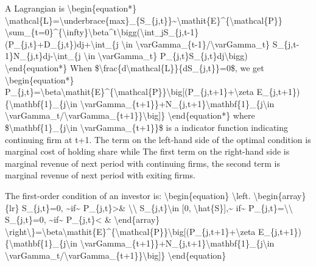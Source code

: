 \documentclass[10pt,math=newtx,citestyle=gb7714-2015,bibstyle=gb7714-2015]{elegantbook}
\begin{document}
	A Lagrangian is
	\textbackslash{}begin\{equation*\}
	\textbackslash{}mathcal\{L\}=\textbackslash{}underbrace\{max\}\_\{S\_\{j,t\}\}\~{}\textbackslash{}mathit\{E\}\^{}\{\textbackslash{}mathcal\{P\}\} \textbackslash{}sum\_\{t=0\}\^{}\{\textbackslash{}infty\}\textbackslash{}beta\^{}t\textbackslash{}bigg(\textbackslash{}int\_jS\_\{j,t-1\}(P\_\{j,t\}+D\_\{j,t\})dj+\textbackslash{}int\_\{j \textbackslash{}in \textbackslash{}varGamma\_\{t-1\}/\textbackslash{}varGamma\_t\} S\_\{j,t-1\}N\_\{j,t\}dj-\textbackslash{}int\_\{j \textbackslash{}in \textbackslash{}varGamma\_t\} P\_\{j,t\}S\_\{j,t\}dj\textbackslash{}bigg)
	\textbackslash{}end\{equation*\}
	When \$\textbackslash{}frac\{d\textbackslash{}mathcal\{L\}\}\{dS\_\{j,t\}\}=0\$, we get
	\textbackslash{}begin\{equation*\}
	P\_\{j,t\}=\textbackslash{}beta\textbackslash{}mathit\{E\}\^{}\{\textbackslash{}mathcal\{P\}\}\textbackslash{}big[(P\_\{j,t+1\}+\textbackslash{}zeta E\_\{j,t+1\})\{\textbackslash{}mathbf\{1\}\_\{j\textbackslash{}in \textbackslash{}varGamma\_\{t+1\}\}+N\_\{j,t+1\}\textbackslash{}mathbf\{1\}\_\{j\textbackslash{}in \textbackslash{}varGamma\_t/\textbackslash{}varGamma\_\{t+1\}\}\textbackslash{}big]\}
	\textbackslash{}end\{equation*\}
	where \$\textbackslash{}mathbf\{1\}\_\{j\textbackslash{}in \textbackslash{}varGamma\_\{t+1\}\}\$ is a indicator function indicating continuing firm at t+1. The term on the left-hand side of the optimal condition is marginal cost of holding share while The first term on the right-hand side is marginal revenue of next period with continuing firms, the second term is marginal revenue of next period with exiting firms.
	
	
	The first-order condition of an investor is:
	\textbackslash{}begin\{equation\}
	\textbackslash{}left.
	\textbackslash{}begin\{array\}\{lr\}
	S\_\{j,t\}=0, \~{}if\~{} P\_\{j,t\}>\&  \textbackslash{}\textbackslash{}
	S\_\{j,t\}\textbackslash{}in [0, \textbackslash{}hat\{S\}],\~{} if\~{} P\_\{j,t\}=\textbackslash{}\textbackslash{}
	S\_\{j,t\}=0, \~{}if\~{} P\_\{j,t\}< \&  
	\textbackslash{}end\{array\}
	\textbackslash{}right\textbackslash{}\}=\textbackslash{}beta\textbackslash{}mathit\{E\}\^{}\{\textbackslash{}mathcal\{P\}\}\textbackslash{}big[(P\_\{j,t+1\}+\textbackslash{}zeta E\_\{j,t+1\})\{\textbackslash{}mathbf\{1\}\_\{j\textbackslash{}in \textbackslash{}varGamma\_\{t+1\}\}+N\_\{j,t+1\}\textbackslash{}mathbf\{1\}\_\{j\textbackslash{}in \textbackslash{}varGamma\_t/\textbackslash{}varGamma\_\{t+1\}\}\textbackslash{}big]\}
	\textbackslash{}end\{equation\}
	
	
	
\end{document}
